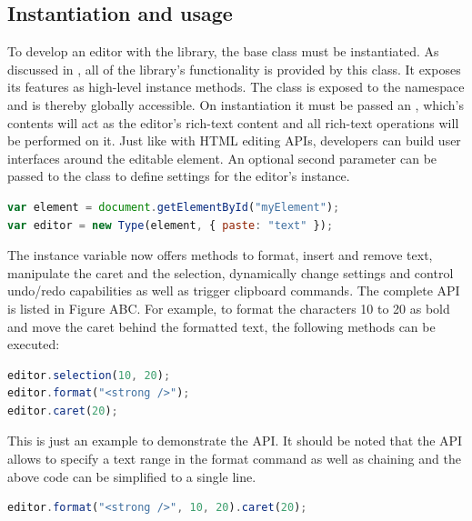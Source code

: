 \subsection{Instantiation and usage}
\label{subsec:instantiation_usage}

To develop an editor with the library, the  base class must be instantiated. As discussed in , all of the library's functionality is provided by this class. It exposes its features as high-level instance methods. The  class is exposed to the  namespace and is thereby globally accessible. On instantiation it must be passed an , which's contents will act as the editor's rich-text content and all rich-text operations will be performed on it. Just like with HTML editing APIs, developers can build user interfaces around the editable element. An optional second parameter can be passed to the class to define settings for the editor's instance.

\begin{lstlisting}[language=JavaScript, caption=Type instantiation, label=lst:type_instantiation]
var element = document.getElementById("myElement");
var editor = new Type(element, { paste: "text" });
\end{lstlisting}

The  instance variable now offers methods to format, insert and remove text, manipulate the caret and the selection, dynamically change settings and control undo/redo capabilities as well as trigger clipboard commands. The complete API is listed in Figure ABC. For example, to format the characters 10 to 20 as bold and move the caret behind the formatted text, the following methods can be executed:

\begin{lstlisting}[language=JavaScript, caption=Example commands to format text, label=lst:type_format_example]
editor.selection(10, 20);
editor.format("<strong />");
editor.caret(20);
\end{lstlisting}

This is just an example to demonstrate the API. It should be noted that the API allows to specify a text range in the format command as well as chaining and the above code can be simplified to a single line.

\begin{lstlisting}[language=JavaScript, caption=Example chaining, label=lst:type_chaining_example]
editor.format("<strong />", 10, 20).caret(20);
\end{lstlisting}

